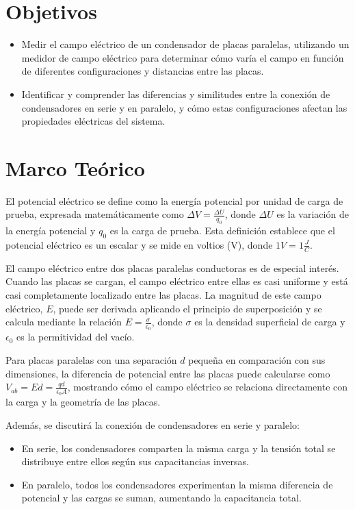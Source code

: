 \section{Objetivos}
\begin{itemize}
    \item Medir el campo eléctrico de un condensador de placas paralelas, utilizando un medidor de campo eléctrico para determinar cómo varía el campo en función de diferentes configuraciones y distancias entre las placas.
    \item Identificar y comprender las diferencias y similitudes entre la conexión de condensadores en serie y en paralelo, y cómo estas configuraciones afectan las propiedades eléctricas del sistema.
\end{itemize}

\section{Marco Teórico}
El potencial eléctrico se define como la energía potencial por unidad de carga de prueba, expresada matemáticamente como $\Delta V = \frac{\Delta U}{q_0}$, donde $\Delta U$ es la variación de la energía potencial y $q_0$ es la carga de prueba. Esta definición establece que el potencial eléctrico es un escalar y se mide en voltios (V), donde $1 V = 1 \frac{J}{C}$.

El campo eléctrico entre dos placas paralelas conductoras es de especial interés. Cuando las placas se cargan, el campo eléctrico entre ellas es casi uniforme y está casi completamente localizado entre las placas. La magnitud de este campo eléctrico, $E$, puede ser derivada aplicando el principio de superposición y se calcula mediante la relación $E = \frac{\sigma}{\epsilon_0}$, donde $\sigma$ es la densidad superficial de carga y $\epsilon_0$ es la permitividad del vacío.

Para placas paralelas con una separación $d$ pequeña en comparación con sus dimensiones, la diferencia de potencial entre las placas puede calcularse como $V_{ab} = E d = \frac{q d}{\epsilon_0 A}$, mostrando cómo el campo eléctrico se relaciona directamente con la carga y la geometría de las placas.

Además, se discutirá la conexión de condensadores en serie y paralelo:
\begin{itemize}
    \item En serie, los condensadores comparten la misma carga y la tensión total se distribuye entre ellos según sus capacitancias inversas.
    \item En paralelo, todos los condensadores experimentan la misma diferencia de potencial y las cargas se suman, aumentando la capacitancia total.
\end{itemize}

